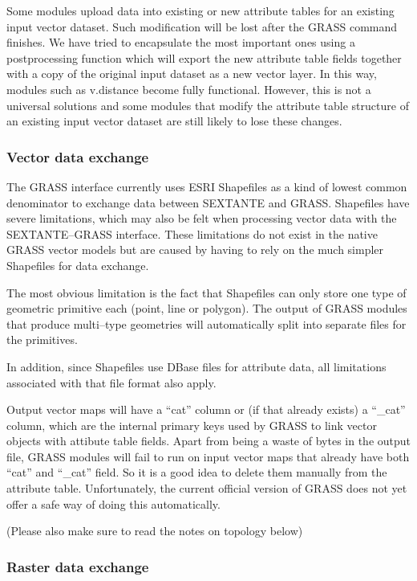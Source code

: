 Some modules upload data into existing or new attribute tables for an existing input vector dataset. Such modification will be lost after the GRASS command finishes. We have tried to encapsulate the most important ones using a postprocessing function which will export the new attribute table fields together with a copy of the original input dataset as a new vector layer. In this way, modules such as v.distance become fully functional. However, this is not a universal solutions and some modules that modify the attribute table structure of an existing input vector dataset are still likely to lose these changes.

\subsubsection{Vector data exchange}

The GRASS interface currently uses ESRI Shapefiles as a kind of lowest common denominator to exchange data between SEXTANTE and GRASS. Shapefiles have severe limitations, which may also be felt when processing vector data with the SEXTANTE--GRASS interface. These limitations do not exist in the native GRASS vector models but are caused by having to rely on the much simpler Shapefiles for data exchange.

The most obvious limitation is the fact that Shapefiles can only store one type of geometric primitive each (point, line or polygon). The output of GRASS modules that produce multi--type geometries will automatically split into separate files for the primitives.

In addition, since Shapefiles use DBase files for attribute data, all limitations associated with that file format also apply.

Output vector maps will have a ``cat'' column or (if that already exists) a ``\_cat'' column, which are the internal primary keys used by GRASS to link vector objects with attibute table fields. Apart from being a waste of bytes in the output file, GRASS modules will fail to run on input vector maps that already have both ``cat'' and ``\_cat'' field. So it is a good idea to delete them manually from the attribute table. Unfortunately, the current official version of GRASS does not yet offer a safe way of doing this automatically.

(Please also make sure to read the notes on topology below)

\subsubsection{Raster data exchange}

